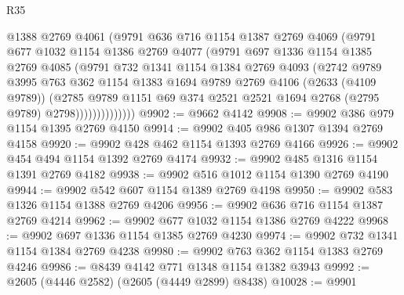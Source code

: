 \begin{lexlean}{R35}
\begin{coremodule}
                    @1388
                    @2769
                    @4061
                    (@9791
                      @636
                      @716
                      @1154
                      @1387
                      @2769
                      @4069
                      (@9791
                        @677
                        @1032
                        @1154
                        @1386
                        @2769
                        @4077
                        (@9791
                          @697
                          @1336
                          @1154
                          @1385
                          @2769
                          @4085
                          (@9791
                            @732
                            @1341
                            @1154
                            @1384
                            @2769
                            @4093
                            (@2742
                              @9789
                              @3995
                              @763
                              @362
                              @1154
                              @1383
                              @1694
                              @9789
                              @2769
                              @4106
                              (@2633 (@4109 @9789))
                              (@2785
                                @9789
                                @1151
                                @69
                                @374
                                @2521
                                @2521
                                @1694
                                @2768
                                (@2795 @9789)
                                @2798))))))))))))))
@9902 := @9662 @4142
@9908 := @9902 @386 @979 @1154 @1395 @2769 @4150
@9914 := @9902 @405 @986 @1307 @1394 @2769 @4158
@9920 := @9902 @428 @462 @1154 @1393 @2769 @4166
@9926 := @9902 @454 @494 @1154 @1392 @2769 @4174
@9932 := @9902 @485 @1316 @1154 @1391 @2769 @4182
@9938 := @9902 @516 @1012 @1154 @1390 @2769 @4190
@9944 := @9902 @542 @607 @1154 @1389 @2769 @4198
@9950 := @9902 @583 @1326 @1154 @1388 @2769 @4206
@9956 := @9902 @636 @716 @1154 @1387 @2769 @4214
@9962 := @9902 @677 @1032 @1154 @1386 @2769 @4222
@9968 := @9902 @697 @1336 @1154 @1385 @2769 @4230
@9974 := @9902 @732 @1341 @1154 @1384 @2769 @4238
@9980 := @9902 @763 @362 @1154 @1383 @2769 @4246
@9986 := @8439 @4142 @771 @1348 @1154 @1382 @3943
@9992 := @2605 (@4446 @2582) (@2605 (@4449 @2899) @8438)
@10028 := @9901

\end{coremodule}
\end{lexlean}

